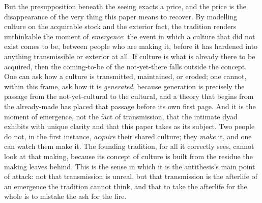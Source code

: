 But the presupposition beneath the seeing exacts a price, and the price is the disappearance of the very thing this paper means to recover. By modelling culture on the acquirable stock and the exterior fact, the tradition renders unthinkable the moment of \emph{emergence}: the event in which a culture that did not exist comes to be, between people who are making it, before it has hardened into anything transmissible or exterior at all. If culture is what is already there to be acquired, then the coming-to-be of the not-yet-there falls outside the concept. One can ask how a culture is transmitted, maintained, or eroded; one cannot, within this frame, ask how it is \emph{generated}, because generation is precisely the passage from the not-yet-cultural to the cultural, and a theory that begins from the already-made has placed that passage before its own first page. And it is the moment of emergence, not the fact of transmission, that the intimate dyad exhibits with unique clarity and that this paper takes as its subject. Two people do not, in the first instance, \emph{acquire} their shared culture; they \emph{make} it, and one can watch them make it. The founding tradition, for all it correctly sees, cannot look at that making, because its concept of culture is built from the residue the making leaves behind. This is the sense in which it is the antithesis's main point of attack: not that transmission is unreal, but that transmission is the afterlife of an emergence the tradition cannot think, and that to take the afterlife for the whole is to mistake the ash for the fire.
